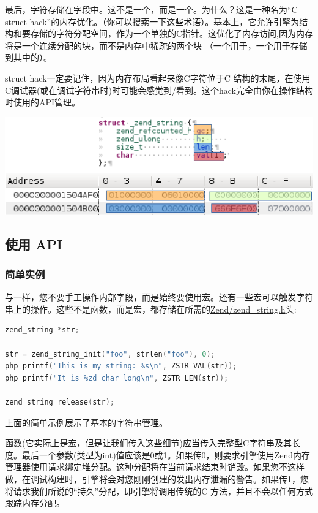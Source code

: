 最后，字符存储在字段中。这不是一个，而是一个。为什么？这是一种名为“C struct hack”的内存优化。（你可以搜索一下这些术语）。基本上，它允许引擎为结构和要存储的字符分配空间，作为一个单独的C指针。这优化了内存访问,因为内存将是一个连续分配的块，而不是内存中稀疏的两个块
（一个用于，一个用于存储到其中的）。

struct hack一定要记住，因为内存布局看起来像C字符位于C 结构的末尾，在使用C调试器(或在调试字符串时)时可能会感觉到/看到。这个hack完全由你在操作结构时使用的API管理。

\includegraphics{images/zend_string_memory_layout.png} 

\subsection{使用 API}

\subsubsection{简单实例}

与一样，您不要手工操作内部字段，而是始终要使用宏。还有一些宏可以触发字符串上的操作。这些不是函数，而是宏，都存储在所需的\href{https://github.com/php/php-src/blob/PHP-7.0/Zend/zend_string.h}{Zend/zend\_string.h}头:

\begin{lstlisting}[language=c]
zend_string *str;

str = zend_string_init("foo", strlen("foo"), 0);
php_printf("This is my string: %s\n", ZSTR_VAL(str));
php_printf("It is %zd char long\n", ZSTR_LEN(str));

zend_string_release(str);
\end{lstlisting}

上面的简单示例展示了基本的字符串管理。

函数(它实际上是宏，但是让我们传入这些细节)应当传入完整型C字符串及其长度。最后一个参数(类型为int)值应该是0或1。如果传0，则要求引擎使用Zend内存管理器使用请求绑定堆分配。这种分配将在当前请求结束时销毁。如果您不这样做，在调试构建时，引擎将会对您刚刚创建的发出内存泄漏的警告。如果传1，您将请求我们所说的“持久”分配，即引擎将调用传统的C 方法，并且不会以任何方式跟踪内存分配。

